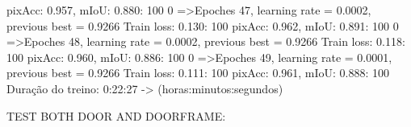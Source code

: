 pixAcc: 0.957, mIoU: 0.880: 100%
  0%
=>Epoches 47, learning rate = 0.0002,                 previous best = 0.9266
Train loss: 0.130: 100%
pixAcc: 0.962, mIoU: 0.891: 100%
  0%
=>Epoches 48, learning rate = 0.0002,                 previous best = 0.9266
Train loss: 0.118: 100%
pixAcc: 0.960, mIoU: 0.886: 100%
  0%
=>Epoches 49, learning rate = 0.0001,                 previous best = 0.9266
Train loss: 0.111: 100%
pixAcc: 0.961, mIoU: 0.888: 100%
Duração do treino: 0:22:27 -> (horas:minutos:segundos)

\bigskip

TEST BOTH DOOR AND DOORFRAME:


